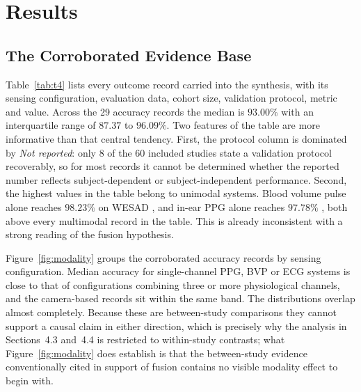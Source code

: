 \section{Results}

\subsection{The Corroborated Evidence Base}
Table~\ref{tab:t4} lists every outcome record carried into the synthesis, with its sensing
configuration, evaluation data, cohort size, validation protocol, metric and value. Across
the 29 accuracy records the median is $93.00\%$ with an interquartile range of
$87.37$ to $96.09\%$. Two features of the table are more informative than that central
tendency. First, the protocol column is dominated by \textit{Not reported}: only 8 of the 60
included studies state a validation protocol recoverably, so for most records it cannot be
determined whether the reported number reflects subject-dependent or subject-independent
performance. Second, the highest values in the table belong to unimodal systems. Blood volume
pulse alone reaches $98.23\%$ on WESAD \cite{r50}, and in-ear PPG alone reaches $97.78\%$
\cite{r43}, both above every multimodal record in the table. This is already inconsistent
with a strong reading of the fusion hypothesis.

\begin{table}[!htbp]
\centering
\caption{Corroborated outcome records contributing to the quantitative synthesis. Every value
was recovered from the publisher or indexed record; no value is taken from a secondary
citation. LOSO denotes leave-one-subject-out validation and NR denotes a cohort size or
protocol that could not be recovered.}
\label{tab:t4}
\scriptsize
\resizebox{\textwidth}{!}{}
\end{table}

Figure~\ref{fig:modality} groups the corroborated accuracy records by sensing configuration.
Median accuracy for single-channel PPG, BVP or ECG systems is close to that of configurations
combining three or more physiological channels, and the camera-based records sit within the
same band. The distributions overlap almost completely. Because these are between-study
comparisons they cannot support a causal claim in either direction, which is precisely why
the analysis in Sections~4.3 and~4.4 is restricted to within-study contrasts; what
Figure~\ref{fig:modality} does establish is that the between-study evidence conventionally
cited in support of fusion contains no visible modality effect to begin with.

